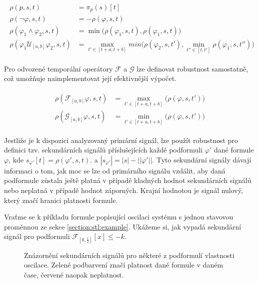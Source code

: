 \begin{align}\label{eq:stl:semantics}
\begin{array}{ll}
\rho(p, s, t)											&= \pi_p(s)[t]											\\
\rho(\neg\varphi, s, t)									&= - \rho(\varphi, s, t)								\\
\rho(\varphi_1 \wedge \varphi_2, s, t)					&= \min\Big(\rho(\varphi_1, s, t), \rho(\varphi_1, s, t)\Big)	\\
\rho(\varphi_1 \mathcal{U}_{[a, b]} \varphi_2, s, t)	&= {\displaystyle \max_{t' \in [t + a, t + b]}} min\Big(\rho(\varphi_2, s, t'), {\displaystyle\min_{t'' \in [t, t']}}\rho(\varphi_1, s, t'')\Big)
\end{array}
\end{align}

Pro odvozené temporální operátory $\mathcal{F}$ a $\mathcal{G}$ lze definovat robustnost
samostatně, což umožňuje naimplementovat její efektivnější výpočet.

\begin{align}\label{eq:stl:semantics}
\begin{array}{ll}
\rho(\mathcal{F}_{[a, b]}\varphi, s, t)		&= {\displaystyle \max_{t' \in [t + a, t + b]}} \Big(\rho(\varphi, s, t')\Big)		\\
\rho(\mathcal{G}_{[a, b]}\varphi, s, t)		&= {\displaystyle \min_{t' \in [t + a, t + b]}} \Big(\rho(\varphi, s, t')\Big)		
\end{array}
\end{align}

Jestliže je k dispozici analyzovaný primární signál, lze použít robustnost pro definici tzv. sekundárních
signálů příslušejících každé podformuli $\varphi'$ dané formule $\varphi$, kde $s_{\varphi'}[t] = \rho(\varphi', s, t)$.
a $|s_{\varphi'}| = |s| - ||\varphi'||$. Tyto se\-kun\-dár\-ní signály dávají informaci o tom, jak moc se lze od primárního
signálu vzdálit, aby daná podformule zůstala ještě platná v případě klad\-ných hodnot sekundárních signálů
nebo neplatná v případě hodnot zá\-por\-ných. Krajní hodnotou je signál nulový, který značí hranici platnosti formule.

Vraťme se k příkladu formule popisující oscilaci systému s jednou stavovou proměnnou ze 
sekce \ref{section:stl:example}. Ukážeme si, jak vypadá sekundární signál pro podformuli
$\mathcal{F}_{[0, \frac{1}{2}]}[x] \leq -k$.

\begin{figure}[h!]
\begin{center}
\caption{Znázornění sekundárních signálů pro některé z podformulí vlastnosti oscilace. Zelené podbarvení
značí platnost dané formule v daném čase, červené naopak neplatnost.}
\end{center}
\end{figure}


